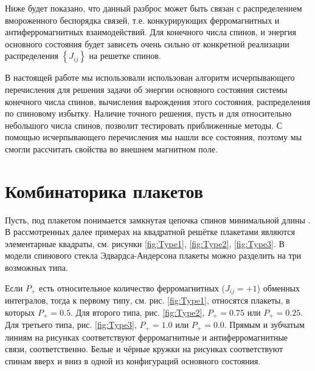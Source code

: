 \documentclass[utf8, babel, sor, jor, amsmath, amssymb, reprint]{elsarticle} %
\begin{document}
Ниже будет показано, что данный разброс может быть связан с распределением вмороженного беспорядка связей, т.е. конкурирующих ферромагнитных и антиферромагнитных взаимодействий. 
Для конечного числа спинов, и энергия основного состояния будет зависеть очень сильно от конкретной реализации распределения $\left\lbrace J_{ij} \right\rbrace $ на решетке спинов. 

В настоящей работе мы использовали использован алгоритм исчерпывающего перечисления \cite{padalko2021parallel} для решения задачи об энергии основного состояния системы конечного числа спинов, вычисления вырождения этого состояния, распределения по спиновому избытку. Наличие точного решения, пусть и для относительно небольшого числа спинов, позволит тестировать приближенные методы. С помощью исчерпывающего перечисления мы нашли все состояния, поэтому мы смогли рассчитать свойства во внешнем магнитном поле. 



\section{Комбинаторика плакетов}

Пусть, под плакетом понимается замкнутая цепочка спинов минимальной длины \cite{lebrecht2015j}. В рассмотренных далее примерах на квадратной решётке плакетами являются элементарные квадраты, см. рисунки \ref{fig:Type1}, \ref{fig:Type2}, \ref{fig:Type3}. В модели спинового стекла Эдвардса-Андерсона плакеты можно разделить на три возможных типа. 

Если $P_+$ есть относительное количество ферромагнитных ($J_{ij}=+1$) обменных интегралов, тогда к первому типу, см. рис. \ref{fig:Type1}, относятся плакеты, в которых $P_+=0.5$. Для второго типа, рис. \ref{fig:Type2}, $P_+=0.75$ или $P_+=0.25$. Для третьего типа, рис. \ref{fig:Type3}, $P_+=1.0$ или $P_+=0.0$. Прямым и зубчатым линиям на рисунках соответствуют ферромагнитные и антиферромагнитные связи, соответственно. Белые и чёрные кружки на рисунках соответствуют спинам вверх и вниз в одной из конфигураций основного состояния.
\end{document}
